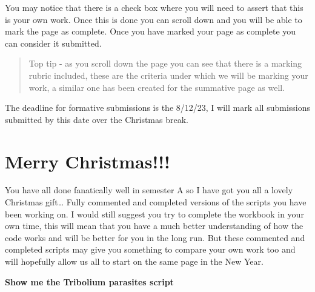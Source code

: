 \documentclass[
]{book}
\begin{document}
You may notice that there is a check box where you will need to assert that this is your own work. Once this is done you can scroll down and you will be able to mark the page as complete. Once you have marked your page as complete you can consider it submitted.

\begin{quote}
Top tip - as you scroll down the page you can see that there is a marking rubric included, these are the criteria under which we will be marking your work, a similar one has been created for the summative page as well.
\end{quote}

The deadline for formative submissions is the 8/12/23, I will mark all submissions submitted by this date over the Christmas break.

\hypertarget{code}{%
\chapter{Merry Christmas!!!}\label{code}}

You have all done fanatically well in semester A so I have got you all a lovely Christmas gift\ldots{} Fully commented and completed versions of the scripts you have been working on. I would still suggest you try to complete the workbook in your own time, this will mean that you have a much better understanding of how the code works and will be better for you in the long run. But these commented and completed scripts may give you something to compare your own work too and will hopefully allow us all to start on the same page in the New Year.

\textbf{Show me the Tribolium parasites script}
\end{document}
